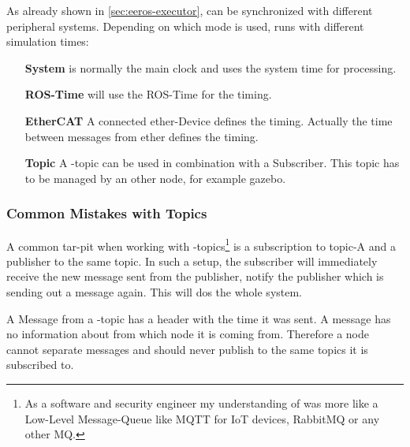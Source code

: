 As already shown in \ref{sec:eeros-executor},  can be synchronized with different peripheral systems.
Depending on which mode is used,  runs with different simulation times:

\begin{itemize}
    \item[\textbf{System}]  is normally the main clock and uses the system time for processing.
    \item[\textbf{ROS-Time}]  will use the ROS-Time for the timing.
    \item[\textbf{EtherCAT}] A connected \Gls{ether}-Device defines the timing.
    Actually the time between messages from \Gls{ether} defines the timing.
    \item[\textbf{Topic}] A -\Gls{topic} can be used in combination with a Subscriber.
    This \gls{topic} has to be managed by an other node, for example \Gls{gazebo}.
\end{itemize}



\subsubsection[Mistakes]{Common Mistakes with Topics} \label{sec:ros-common-mistakes}

A common tar-pit when working with -\Glspl{topic}\footnote{As a software and security engineer my understanding of  was more like a Low-Level Message-Queue like MQTT for IoT devices, RabbitMQ or any other MQ.} is a subscription to \gls{topic}-A and a publisher to the same \gls{topic}.
In such a setup, the subscriber will immediately receive the new message sent from the publisher, notify the publisher which is sending out a message again.
This will \gls{dos} the whole system.

A Message from a -\Gls{topic} has a header with the time it was sent.
A message has no information about from which \Gls{node} it is coming from.
Therefore a node cannot separate messages and should never publish to the same topics it is subscribed to.



